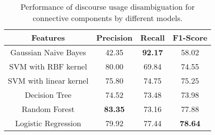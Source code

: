 \begin{table}[h]
\centering
\begin{tabular}{|c|c|c|c|}
\hline

\bf Features               & \bf Precision & \bf Recall & \bf F1-Score \\ \hline
    Gaussian Naive Bayes   &     42.35     & \bf 92.17  &     58.02    \\ \hline
    SVM with RBF kernel    &     80.00     &     69.84  &     74.55    \\ \hline
    SVM with linear kernel &     75.80     &     74.75  &     75.25    \\ \hline
    Decision Tree          &     74.52     &     73.48  &     73.98    \\ \hline
    Random Forest          & \bf 83.35     &     73.16  &     77.88    \\ \hline
    Logistic Regression    &     79.92     &     77.44  & \bf 78.64    \\ \hline

\end{tabular}
\caption{\label{t:recognition-models} Performance of discourse usage
disambiguation for connective components by different models. }
\end{table}
